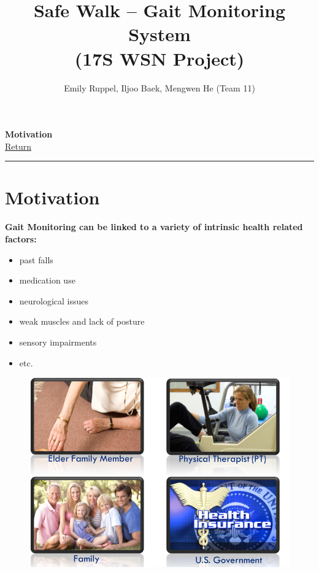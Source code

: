 \documentclass[letterpaper,12pt]{article}
\title{\textbf{Safe Walk -- Gait Monitoring System\\\small (17S WSN Project)}}
\author{Emily Ruppel, Iljoo Baek, Mengwen He (Team 11)}
\newcommand{\panhline}{\begin{center}\rule{\textwidth}{1pt}\end{center}}
\begin{document}
\maketitle

\textbf{Motivation}\\
\href{../index.html}{Return}
\panhline
\section{Motivation}

\textbf{Gait Monitoring can be linked to a variety of intrinsic health related factors:}
\begin{itemize}
	\item past falls
	\item medication use
	\item neurological issues
	\item weak muscles and lack of posture
	\item sensory impairments
	\item etc.
\end{itemize}

\begin{figure}[!h]
	\centering
	\includegraphics[width=15cm]{./imgs/motivation.png}
\end{figure}
\end{document}
